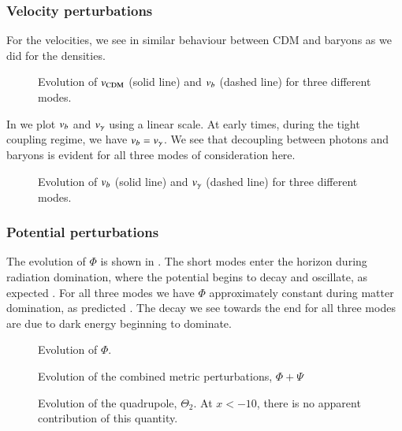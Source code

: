\subsubsection{Velocity perturbations}\label{sssec:M3:results:velocity_perturbations}
For the velocities, we see in  similar behaviour between CDM and baryons as we did for the densities. 

\begin{figure}[ht!]
    \caption{Evolution of $v_\mathrm{CDM}$ (solid line) and $v_b$ (dashed line) for three different modes.}
    \label{fig:M3:results:vel_CDM_b}
\end{figure}

In  we plot $v_b$ and $v_\gamma$ using a linear scale. At early times, during the tight coupling regime, we have $v_b=v_\gamma$. We see that decoupling between photons and baryons is evident for all three modes of consideration here.  

\begin{figure}[ht!]
    \caption{Evolution of $v_b$ (solid line) and $v_\gamma$ (dashed line) for three different modes.}
    \label{fig:M3:results:vel_photon_b}
\end{figure}

\subsubsection{Potential perturbations} \label{sssec:M3:results:metric_perturbations}
The evolution of $\Phi$ is shown in . The short modes enter the horizon during radiation domination, where the potential begins to decay and oscillate, as expected . For all three modes we have $\Phi$ approximately constant during matter domination, as predicted . The decay we see towards the end for all three modes are due to dark energy beginning to dominate. 
\begin{figure}[ht!]
    \caption{Evolution of $\Phi$.}
    \label{fig:M3:results:Phi}
\end{figure}


\begin{figure}[ht!]
    \caption{Evolution of the combined metric perturbations, $\Phi+\Psi$}
    \label{fig:M3:results:Phi_plus_Psi}
\end{figure}



\begin{figure}[ht!]
    \caption{Evolution of the quadrupole, $\Theta_2$. At $x<-10$, there is no apparent contribution of this quantity.}
    \label{fig:M3:results:Theta2}
\end{figure}
